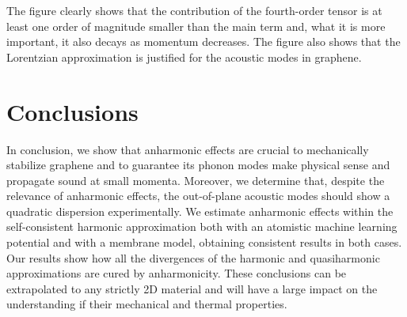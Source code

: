 The figure clearly shows that the contribution of the fourth-order tensor is at least one order of magnitude smaller 
than the main term and, what it is more important, it also decays as momentum decreases. The figure also shows that 
the Lorentzian approximation is justified for the acoustic modes in graphene.

\section{Conclusions}

In conclusion, we show that anharmonic effects are crucial to mechanically stabilize graphene and to guarantee its 
phonon modes make physical sense and propagate sound at small momenta. Moreover, we determine that, despite the 
relevance of anharmonic effects, the out-of-plane acoustic modes should show a quadratic dispersion experimentally. 
We estimate anharmonic effects within the self-consistent harmonic approximation both with an atomistic machine 
learning potential and with a membrane model, obtaining consistent results in both cases. Our results show how all 
the divergences of the harmonic and quasiharmonic approximations are cured by anharmonicity. These conclusions can 
be extrapolated to any strictly 2D material and will have a large impact on the understanding if their mechanical 
and thermal properties.
